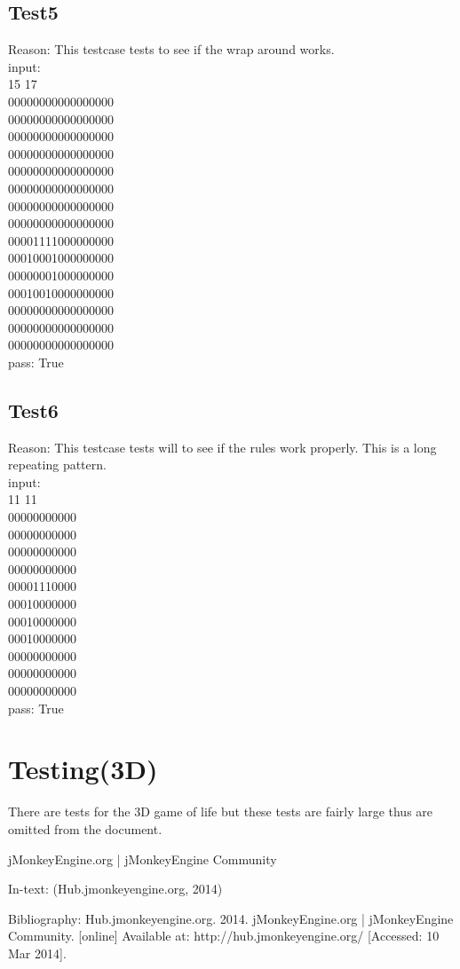 \documentclass[a4paper, 10pt]{article}
\begin{document}
\subsection{Test5}
Reason: This testcase tests to see if the wrap around works.\\
input:\\
15 17\\
00000000000000000\\
00000000000000000\\
00000000000000000\\
00000000000000000\\
00000000000000000\\
00000000000000000\\
00000000000000000\\
00000000000000000\\
00001111000000000\\
00010001000000000\\
00000001000000000\\
00010010000000000\\
00000000000000000\\
00000000000000000\\
00000000000000000\\
pass: True
\subsection{Test6}
Reason: This testcase tests will to see if the rules work properly. This is a long repeating pattern.\\
input:\\
11 11\\
00000000000\\
00000000000\\
00000000000\\
00000000000\\
00001110000\\
00010000000\\
00010000000\\
00010000000\\
00000000000\\
00000000000\\
00000000000\\
pass: True
\section{Testing(3D)}
There are tests for the 3D game of life but these tests are fairly large thus are omitted from the document.
\begin{thebibliography}{99}
jMonkeyEngine.org | jMonkeyEngine Community

In-text: (Hub.jmonkeyengine.org, 2014)

Bibliography: Hub.jmonkeyengine.org. 2014. jMonkeyEngine.org | jMonkeyEngine Community. [online] Available at: http://hub.jmonkeyengine.org/ [Accessed: 10 Mar 2014].
\end{thebibliography}
\end{document}
